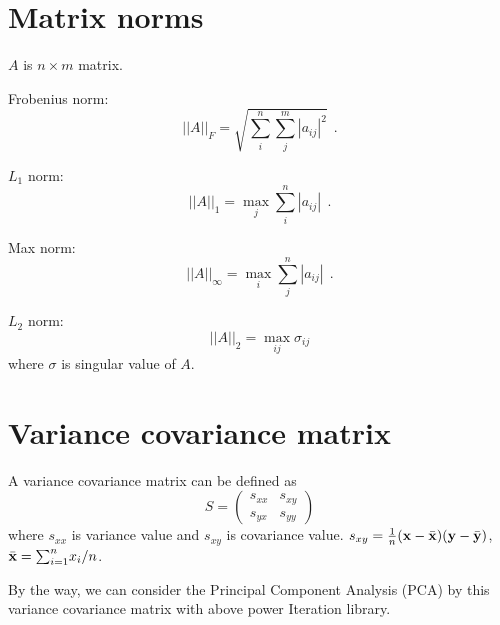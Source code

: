 \documentclass[dvipdfmx]{article}
\begin{document}
 
\section*{Matrix norms}
$A$ is $n{\times}m$ matrix.

Frobenius norm:
$$
||A||_F = \sqrt{{\sum_i^n}{\sum_j^m} |a_{ij}|^2} \ \ .
$$
 
$L_1$ norm:
$$
||A||_1 = \max_{j}  {\sum_i^n} |a_{ij}| \ \ .
$$

Max norm:
$$
||A||_{\infty} = \max_{i}  {\sum_j^n} |a_{ij}| \ \ .
$$

$L_2$ norm:
$$
||A||_2 = \max_{ij}  {\sigma}_{ij}
$$
where $\sigma$ is singular value of $A$.


\section*{Variance covariance matrix}
A variance covariance matrix can be defined as
 \[
   S =
   \left(
   \begin{array}{cc}
   s_{xx} & s_{xy} \\
   s_{yx} & s_{yy}  
   \end{array}
   \right) 
  \]
where $s_{xx}$ is variance value and $s_{xy}$ is covariance value.
$s_{xy} = \frac{1}{n}({\bf{x}} - \bar{\bf{x}})({\bf{y}} - \bar{\bf{y}})$, $\bar{\bf{x}} = {\sum_{i=1}^n} x_i /n$.

By the way, we can consider the Principal Component Analysis (PCA) by this variance covariance matrix with above power Iteration library.
\end{document}
